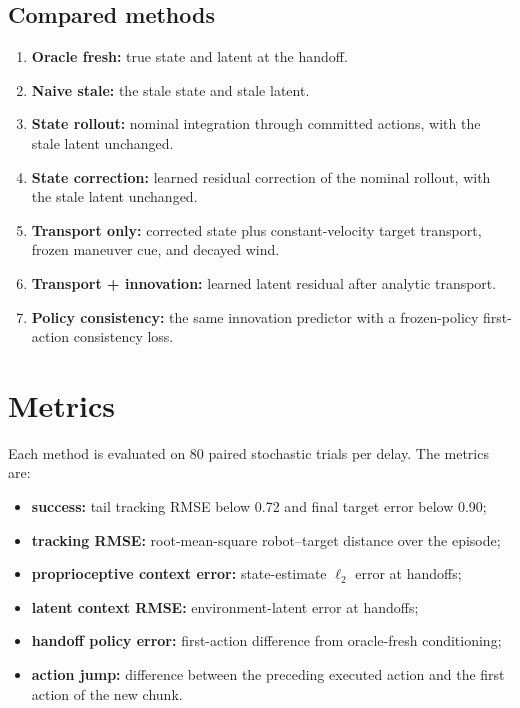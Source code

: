 \documentclass[11pt]{article}
\begin{document}
\subsection{Compared methods}

\begin{enumerate}[leftmargin=1.5em]
  \item \textbf{Oracle fresh:} true state and latent at the handoff.
  \item \textbf{Naive stale:} the stale state and stale latent.
  \item \textbf{State rollout:} nominal integration through committed actions, with the stale latent unchanged.
  \item \textbf{State correction:} learned residual correction of the nominal rollout, with the stale latent unchanged.
  \item \textbf{Transport only:} corrected state plus constant-velocity target transport, frozen maneuver cue, and decayed wind.
  \item \textbf{Transport + innovation:} learned latent residual after analytic transport.
  \item \textbf{Policy consistency:} the same innovation predictor with a frozen-policy first-action consistency loss.
\end{enumerate}

\section{Metrics}

Each method is evaluated on 80 paired stochastic trials per delay. The metrics are:
\begin{itemize}[leftmargin=1.5em]
  \item \textbf{success:} tail tracking RMSE below 0.72 and final target error below 0.90;
  \item \textbf{tracking RMSE:} root-mean-square robot--target distance over the episode;
  \item \textbf{proprioceptive context error:} state-estimate $\ell_2$ error at handoffs;
  \item \textbf{latent context RMSE:} environment-latent error at handoffs;
  \item \textbf{handoff policy error:} first-action difference from oracle-fresh conditioning;
  \item \textbf{action jump:} difference between the preceding executed action and the first action of the new chunk.
\end{itemize}
\end{document}
